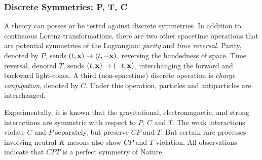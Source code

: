 \subsubsection{Discrete Symmetries: P, T, C}
\label{sec:discrete-symmetries}

A theory can posses or be tested against discrete symmetries. In addition to continuous Lorenz transformations, there are two other spacetime operations that are potential symmetries of the Lagrangian: \emph{parity} and \emph{time reversal}. Parity, denoted by $P$, sends $(t,\vb{x})\rightarrow(t,-\vb{x})$, reversing the handedness of space. Time reversal, denoted $T$, sends $(t,\vb{x})\rightarrow(-t,\vb{x})$, interchanging the forward and backward light-cones. A third (non-spacetime) discrete operation is \emph{charge conjugation}, denoted by $C$. Under this operation, particles and antiparticles are interchanged.

Experimentally, it is known that the gravitational, electromagnetic, and strong interactions are symmetric with respect to $P$, $C$ and $T$. The weak interactions violate $C$ and $P$ separately, but preserve $CP$ and $T$. But certain rare processes involving neutral $K$ mesons also show $CP$ and $T$ violation. All observations indicate that $CPT$ is a perfect symmetry of Nature.

